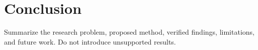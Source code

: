 \section{Conclusion}\label{sec:conclusion}
Summarize the research problem, proposed method, verified findings, limitations, and future work. Do not introduce unsupported results.

